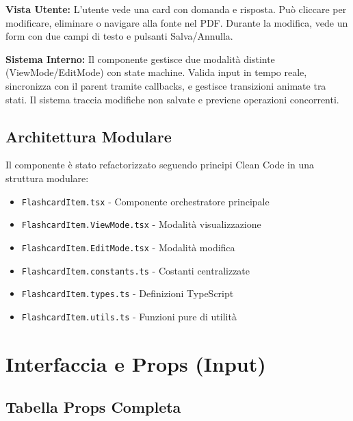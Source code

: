 \documentclass[11pt,a4paper]{article}
\begin{document}
\begin{tcolorbox}[colback=blue!5!white,colframe=blue!75!black,title=Modello Mentale]
\textbf{Vista Utente:}
L'utente vede una card con domanda e risposta. Può cliccare per modificare, eliminare o navigare alla fonte nel PDF. Durante la modifica, vede un form con due campi di testo e pulsanti Salva/Annulla.

\textbf{Sistema Interno:}
Il componente gestisce due modalità distinte (ViewMode/EditMode) con state machine. Valida input in tempo reale, sincronizza con il parent tramite callbacks, e gestisce transizioni animate tra stati. Il sistema traccia modifiche non salvate e previene operazioni concorrenti.
\end{tcolorbox}

\subsection{Architettura Modulare}

Il componente è stato refactorizzato seguendo principi Clean Code in una struttura modulare:

\begin{itemize}
    \item \texttt{FlashcardItem.tsx} - Componente orchestratore principale
    \item \texttt{FlashcardItem.ViewMode.tsx} - Modalità visualizzazione
    \item \texttt{FlashcardItem.EditMode.tsx} - Modalità modifica
    \item \texttt{FlashcardItem.constants.ts} - Costanti centralizzate
    \item \texttt{FlashcardItem.types.ts} - Definizioni TypeScript
    \item \texttt{FlashcardItem.utils.ts} - Funzioni pure di utilità
\end{itemize}


\section{Interfaccia e Props (Input)}

\subsection{Tabella Props Completa}
\end{document}
